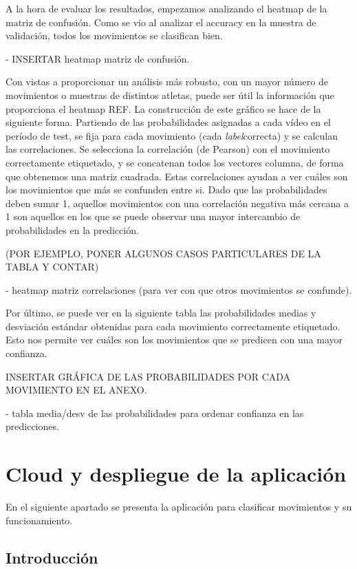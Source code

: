 A la hora de evaluar los resultados, empezamos analizando el heatmap de la matriz de confusión. Como se vio al analizar el accuracy en la muestra de validación, todos los movimientos se clasifican bien.

- INSERTAR heatmap matriz de confusión.

Con vistas a proporcionar un análisis más robusto, con un mayor número de movimientos o muestras de distintos atletas, puede ser útil la información que proporciona el heatmap REF. La construcción de este gráfico se hace de la siguiente forma. Partiendo de las probabilidades asignadas a cada vídeo en el período de test, se fija para cada movimiento (cada \textit{label}correcta) y se calculan las correlaciones. Se selecciona la correlación  (de Pearson) con el movimiento correctamente etiquetado, y se concatenan todos los vectores columna, de forma que obtenemos una matriz cuadrada. Estas correlaciones ayudan a ver cuáles son los movimientos que más se confunden entre si. Dado que las probabilidades deben sumar 1, aquellos movimientos con una correlación negativa más cercana a 1 son aquellos en los que se puede observar una mayor intercambio de probabilidades en la predicción.

(POR EJEMPLO, PONER ALGUNOS CASOS PARTICULARES DE LA TABLA Y CONTAR)

- heatmap matriz correlaciones (para ver con que otros movimientos se confunde).

Por último, se puede ver en la siguiente tabla las probabilidades medias y desviación estándar obtenidas para cada movimiento correctamente etiquetado. Esto nos permite ver cuáles son los movimientos que se predicen con una mayor confianza.

INSERTAR GRÁFICA DE LAS PROBABILIDADES POR CADA MOVIMIENTO EN EL ANEXO.

- tabla media/desv de las probabilidades para ordenar confianza en las predicciones.

\section{Cloud y despliegue de la aplicación}

En el siguiente apartado se presenta la aplicación para clasificar movimientos y su funcionamiento.

\subsection{Introducción}

